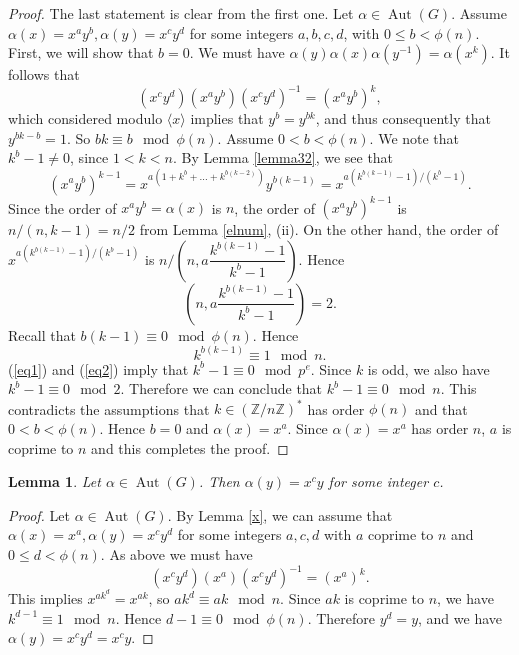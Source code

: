 \documentclass{amsart}
\newcommand{\bbz}{{\mathbb Z}}
\newcommand{\lan}{\langle}
\newcommand{\ran}{\rangle}
\newtheorem{lem}[thm]{Lemma}
\begin{document}
\begin{proof}
The last statement is clear from the first one.
Let $\alpha \in \operatorname{Aut}(G)$.
Assume $\alpha(x)=x^ay^b, \alpha(y)=x^c y^d$ for some integers $a,b,c,d$, with $0 \leq b < \phi(n)$.
First, we will show that $b=0$.
We must have $\alpha(y)\alpha(x) \alpha(y^{-1})=\alpha(x^k)$.
It follows that 
\[(x^cy^d)(x^ay^b)(x^c y^d)^{-1}=(x^a y^b)^k, \]
which considered modulo $\lan x \ran$ implies that 
$y^b=y^{bk}$, and thus consequently that $y^{bk-b}=1$.
So $bk \equiv b \mod \phi(n)$.
Assume $0<b<\phi(n)$.
We note that $k^b -1 \neq 0$, since $1<k <n$. 
By Lemma \ref{lemma32}, we see that
\[(x^ay^b)^{k-1}=x^{a(1+k^b+ \dots + k^{b(k-2)})}y^{b(k-1)}=x^{a(k^{b(k-1)}-1)/(k^b -1)}.\]
Since the order of $x^ay^b=\alpha(x)$ is $n$, 
the order of $(x^ay^b)^{k-1}$ is $n/(n,k-1)=n/2$
from Lemma \ref{elnum}, (ii).
On the other hand, the order of 
$x^{a(k^{b(k-1)}-1)/(k^b -1)}$ is $n/\left(n, a\dfrac{k^{b(k-1)}-1}{k^b-1} \right)$.
Hence
\begin{equation}\label{eq1}
\left(n, a\dfrac{k^{b(k-1)}-1}{k^b-1} \right)=2.
\end{equation}
Recall that $b(k-1) \equiv 0 \mod \phi(n)$.
Hence
\begin{equation}\label{eq2}
k^{b(k-1)} \equiv 1 \mod n.
\end{equation}
(\ref{eq1}) and (\ref{eq2}) imply that 
$k^b -1 \equiv 0 \mod p^e$.
Since $k$ is odd, 
we also have $k^b-1 \equiv 0 \mod 2$.
Therefore we can conclude that $k^b-1
\equiv 0 \mod n$.
This contradicts the assumptions that $k \in (\bbz/n\bbz)^*$ has order $\phi(n)$ and that $0<b<\phi(n)$.
Hence $b=0$ and $\alpha(x)=x^a$.
Since $\alpha(x)=x^a$ has order $n$,
$a$ is coprime to $n$ and this completes the proof.
\end{proof}

\begin{lem}\label{y}
   Let $\alpha \in \operatorname{Aut}(G)$.
   Then $\alpha(y) = x^cy$ for some integer $c$.
\end{lem}

\begin{proof}
Let $\alpha \in \operatorname{Aut}(G)$.
By Lemma \ref{x}, we can assume that $\alpha(x)=x^a, \alpha(y)=x^c y^d$ for some integers $a,c,d$ with $a$ coprime to $n$ and $0 \leq d < \phi(n)$.
As above we must have
\[(x^cy^d)(x^a)(x^c y^d)^{-1}=(x^a)^k. \]
This implies $x^{ak^d}=x^{ak}$,
so $ak^d \equiv ak \mod n$.
Since $ak$ is coprime to $n$,
we have $k^{d-1} \equiv 1 \mod n$.
Hence $d-1 \equiv 0 \mod \phi(n)$.
Therefore $y^d=y$, and we have $\alpha(y)=x^c y^d = x^c y$.
\end{proof}
\end{document}
